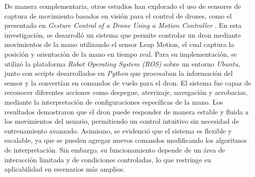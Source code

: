 De manera complementaria, otros estudios han explorado el uso de sensores de captura de movimiento basados en visión para el control de drones, como el presentado en \textit{Gesture Control of a Drone Using a Motion Controller} \cite{suarez2016gesture}. En esta investigación, se desarrolló un sistema que permite controlar un dron mediante movimientos de la mano utilizando el sensor Leap Motion, el cual captura la posición y orientación de la mano en tiempo real. Para su implementación, se utilizó la plataforma \textit{Robot Operating System (ROS)} sobre un entorno \textit{Ubuntu}, junto con scripts desarrollados en \textit{Python} que procesaban la información del sensor y la convertían en comandos de vuelo para el dron. El sistema fue capaz de reconocer diferentes acciones como despegue, aterrizaje, navegación y acrobacias, mediante la interpretación de configuraciones específicas de la mano. Los resultados demostraron que el dron puede responder de manera estable y fluida a los movimientos del usuario, permitiendo un control intuitivo sin necesidad de entrenamiento avanzado. Asimismo, se evidenció que el sistema es flexible y escalable, ya que se pueden agregar nuevos comandos modificando los algoritmos de interpretación. Sin embargo, su funcionamiento depende de un área de interacción limitada y de condiciones controladas, lo que restringe su aplicabilidad en escenarios más amplios.

